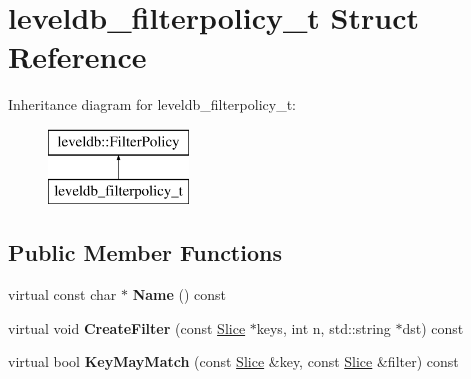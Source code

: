 \hypertarget{structleveldb__filterpolicy__t}{}\section{leveldb\+\_\+filterpolicy\+\_\+t Struct Reference}
\label{structleveldb__filterpolicy__t}
Inheritance diagram for leveldb\+\_\+filterpolicy\+\_\+t\+:\begin{figure}[H]
\begin{center}
\leavevmode
\includegraphics[height=2.000000cm]{structleveldb__filterpolicy__t}
\end{center}
\end{figure}
\subsection*{Public Member Functions}
\begin{DoxyCompactItemize}
\item 
\mbox{\label{structleveldb__filterpolicy__t_a94f31f3d4576ed53d9277e461717e9f3}} 
virtual const char $\ast$ {\bfseries Name} () const
\item 
\mbox{\label{structleveldb__filterpolicy__t_aa833af852917381cd8db4c8ec21a3762}} 
virtual void {\bfseries Create\+Filter} (const \mbox{\hyperlink{classleveldb_1_1_slice}{Slice}} $\ast$keys, int n, std\+::string $\ast$dst) const
\item 
\mbox{\label{structleveldb__filterpolicy__t_a76ed49d956a58622e86d87a89a9ba1f1}} 
virtual bool {\bfseries Key\+May\+Match} (const \mbox{\hyperlink{classleveldb_1_1_slice}{Slice}} \&key, const \mbox{\hyperlink{classleveldb_1_1_slice}{Slice}} \&filter) const
\end{DoxyCompactItemize}
